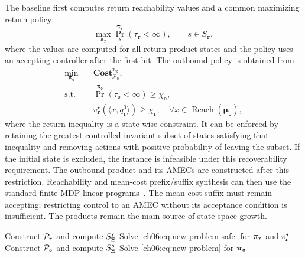 \begin{revision}
The baseline first computes return reachability values and a common
maximizing return policy:
\begin{equation}
\label{ch06:eq:new-problem-safe}
\max_{\boldsymbol\pi_{\texttt r}}
\Pr_s^{\boldsymbol\pi_{\texttt r}}(\tau_{\texttt r}<\infty),
\qquad s\in S_{\texttt r},
\end{equation}
where the values are computed for all return-product states and the policy
uses an accepting controller after the first hit.
The outbound policy is obtained from
\begin{equation}
\label{ch06:eq:new-problem}
\begin{aligned}
\min_{\boldsymbol\pi_{\texttt o}}\quad
&\textbf{Cost}_{\mathcal P_{\texttt o}}^{\boldsymbol\pi_{\texttt o}},\\
\text{s.t.}\quad
&\Pr^{\boldsymbol\pi_{\texttt o}}(\tau_{\texttt o}<\infty)
\ge\chi_{\texttt o},\\
&v_{\texttt r}^{\star}(\langle x,q_{\texttt r}^0\rangle)
\ge\chi_{\texttt r},\quad
\forall x\in\operatorname{Reach}(\boldsymbol\mu_{\texttt o}),
\end{aligned}
\end{equation}
where the return inequality is a state-wise constraint.
It can be enforced by retaining the greatest controlled-invariant subset of
states satisfying that inequality and removing actions with positive
probability of leaving the subset. If the initial state is excluded, the
instance is infeasible under this recoverability requirement.
The outbound product and its AMECs are constructed after this restriction.
Reachability and mean-cost prefix/suffix synthesis can then use the standard
finite-MDP linear programs~\citep{altman1999constrained,bertsekas1991analysis,
guo2018probabilistic,ding2014optimal}. The mean-cost suffix must remain
accepting; restricting control to an AMEC without its acceptance condition
is insufficient. The products remain the main source of state-space growth.
\end{revision}

\begin{algorithm}[t]
\caption{Sequential baseline method}
\label{ch06:alg:direct}
\LinesNumbered
{}
Construct \(\mathcal{P}_{\textup{\texttt{r}}}\) and compute
\(S^{\textup{\texttt{r}}}_{\Xi}\)\;
Solve \eqref{ch06:eq:new-problem-safe} for
\(\boldsymbol{\pi}_{\textup{\texttt{r}}}\) and
\(v^{\star}_{\textup{\texttt{r}}}\)\;
Construct \(\mathcal{P}_{\textup{\texttt{o}}}\) and compute
\(S^{\textup{\texttt{o}}}_{\Xi}\)\;
Solve \eqref{ch06:eq:new-problem} for
\(\boldsymbol{\pi}_{\textup{\texttt{o}}}\)\;
\end{algorithm}


